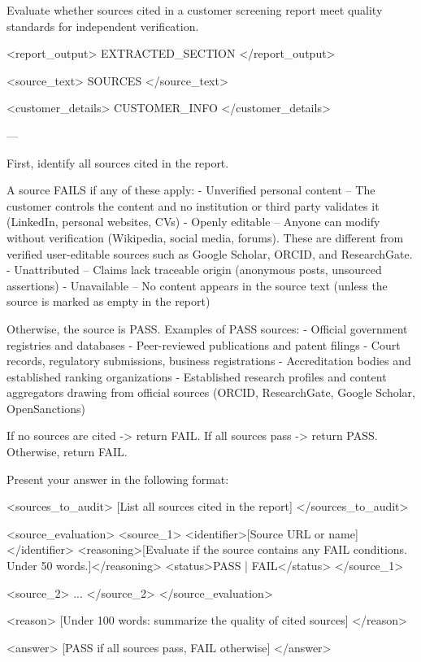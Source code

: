 \documentclass[utf8]{frontiers_suppmat}
\begin{document}
\begin{promptlisting}
Evaluate whether sources cited in a customer screening report meet quality
standards for independent verification.

<report_output>
{{EXTRACTED_SECTION}}
</report_output>

<source_text>
{{SOURCES}}
</source_text>

<customer_details>
{{CUSTOMER_INFO}}
</customer_details>

---

First, identify all sources cited in the report.

A source FAILS if any of these apply:
- Unverified personal content -- The customer controls the content and no
  institution or third party validates it (LinkedIn, personal websites, CVs)
- Openly editable -- Anyone can modify without verification (Wikipedia, social
  media, forums). These are different from verified user-editable sources such
  as Google Scholar, ORCID, and ResearchGate.
- Unattributed -- Claims lack traceable origin (anonymous posts, unsourced
  assertions)
- Unavailable -- No content appears in the source text (unless the source is
  marked as empty in the report)

Otherwise, the source is PASS. Examples of PASS sources:
- Official government registries and databases
- Peer-reviewed publications and patent filings
- Court records, regulatory submissions, business registrations
- Accreditation bodies and established ranking organizations
- Established research profiles and content aggregators drawing from official
  sources (ORCID, ResearchGate, Google Scholar, OpenSanctions)

If no sources are cited -> return FAIL.
If all sources pass -> return PASS. Otherwise, return FAIL.

Present your answer in the following format:

<sources_to_audit>
[List all sources cited in the report]
</sources_to_audit>

<source_evaluation>
<source_1>
<identifier>[Source URL or name]</identifier>
<reasoning>[Evaluate if the source contains any FAIL conditions.
Under 50 words.]</reasoning>
<status>PASS | FAIL</status>
</source_1>

<source_2>
...
</source_2>
</source_evaluation>

<reason>
[Under 100 words: summarize the quality of cited sources]
</reason>

<answer>
[PASS if all sources pass, FAIL otherwise]
</answer>
\end{promptlisting}
\end{document}
